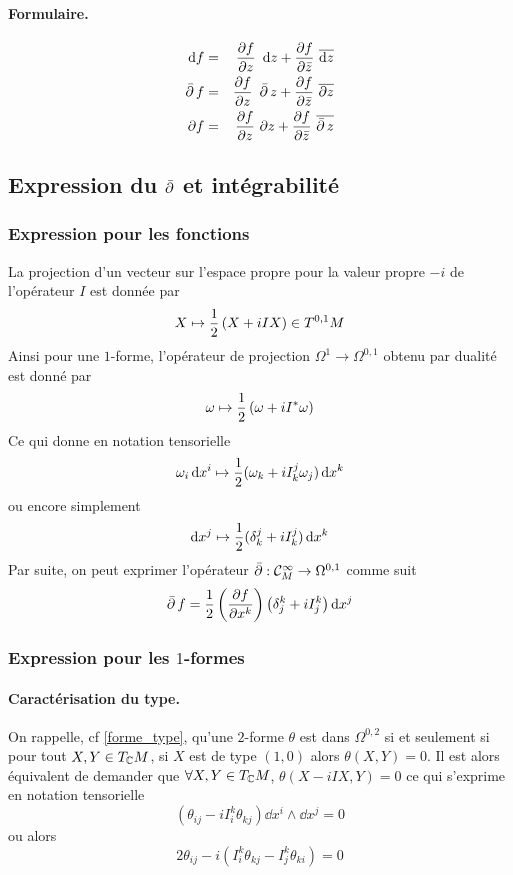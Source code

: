 \documentclass[12pt,draft]{article}
\begin{document}
\paragraph*{Formulaire.}
\begin{eqnarray*}
\dd f & = & \dpp{f}{z}\ \dd z + \dpp{f}{\bar{z}}\ \overline{\dd z} \\
\dbarre f & = & \dpp{f}{z}\ \dbarre z + \dpp{f}{\bar{z}}\ \overline{\partial z} \\
\partial f & = & \dpp{f}{z}\ \partial z + \dpp{f}{\bar{z}}\ \overline{\dbarre z}
\end{eqnarray*}

\subsection{Expression du $\operatorname{\bar{\partial}}$ et intégrabilité}
\subsubsection{Expression pour les fonctions}
La projection d'un vecteur sur l'espace propre pour la valeur propre $-i$ de l'opérateur $I$ est donnée par
\[
X \mapsto \operatorname{\frac{1}{2}}\left(X + iIX\right) \in T^{0,1}M
\]
Ainsi pour une $1$-forme, l'opérateur de projection $\Omega^1 \rightarrow \Omega^{0,1}$ obtenu par dualité est donné par
\[
\omega \mapsto \operatorname{\frac{1}{2}}\left(\omega + i I^* \omega\right)
\]
Ce qui donne en notation tensorielle
\[
\omega_i \operatorname{d\!} x^i \mapsto \operatorname{\frac{1}{2}}(\omega_k +i I^j_k \omega_j)\operatorname{d\!} x^k
\]
ou encore simplement
\begin{equation}
\operatorname{d\!} x^j  \mapsto \operatorname{\frac{1}{2}}(\delta^j_k + i I ^j_k) \operatorname{d\!} x^k
\end{equation}
Par suite, on peut exprimer l'opérateur $\operatorname{\bar{\partial}} : \mathcal{C}^\infty_M \rightarrow \Omega^{0,1}$ comme suit
\begin{equation}
\operatorname{\bar{\partial}} f = \operatorname{\frac{1}{2}} \left(
\dfrac{\partial{f}}{\partial{x^k}}
\right)\left(\delta^k_j + i I^k_j\right) \operatorname{d\!} x^j
\end{equation}
\subsubsection{Expression pour les $1$-formes}
\paragraph*{Caractérisation du type.}
On rappelle, cf {\autoref{forme_type}}, qu'une $2$-forme $\theta$ est dans $\Omega^{0,2}$ si et seulement si pour tout $X,Y \in T_{\mathbb{C}} M$, si $X$ est de type $(1,0)$ alors $\theta(X,Y) = 0$. Il est alors équivalent de demander que $\forall X,Y \in T_{\mathbb{C}} M$, $\theta(X-iIX,Y) = 0$ ce qui s'exprime en notation tensorielle
\[
\left(\theta_{ij} - i I_i^k\theta_{kj}\right)\dd x^i \wedge \dd x^j = 0
\]
ou alors
\[
2\theta_{ij} - i( I_i^k \theta_{kj} - I_j^k \theta_{ki} ) = 0
\]
\end{document}
